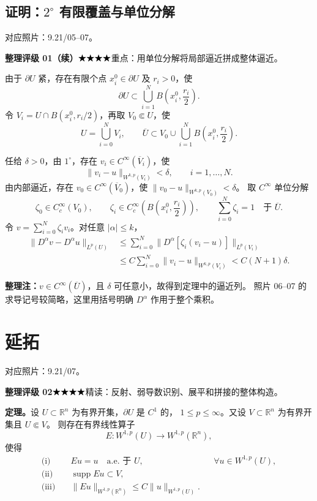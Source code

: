 \documentclass[UTF8,a4paper,11pt,fontset=fandol]{ctexart}
\newcommand{\R}{\mathbb R}
\newcommand{\ednote}[1]{\par{\small\color{notegray}\textbf{整理注：}#1}\par}
\newcommand{\source}[1]{{\small\color{notegray}对应照片：#1。}\par}
\newcommand{\proofstars}[1]{\ensuremath{%
\ifnum#1>0\relax\bigstar\fi
\ifnum#1>1\relax\bigstar\fi
\ifnum#1>2\relax\bigstar\fi
\ifnum#1>3\relax\bigstar\fi
\ifnum#1>4\relax\bigstar\fi}}
\newcommand{\proofrating}[3]{\par{\small\color{proofblue}%
\textbf{整理评级 #1}\enspace\proofstars{#2}\quad #3\par}}
\begin{document}
\subsection*{证明：$2^\circ$ 有限覆盖与单位分解}
\source{9.21/05--07}
\proofrating{01（续）}{4}{重点：用单位分解将局部逼近拼成整体逼近。}
由于 $\partial U$ 紧，存在有限个点 $x_i^0\in\partial U$ 及 $r_i>0$，使
\[
\partial U\subset\bigcup_{i=1}^N B\left(x_i^0,\frac{r_i}{2}\right).
\]
令 $V_i=U\cap B(x_i^0,r_i/2)$，再取 $V_0\Subset U$，使
\[
U=\bigcup_{i=0}^N V_i,\qquad
\overline U\subset V_0\cup\bigcup_{i=1}^N B\left(x_i^0,\frac{r_i}{2}\right).
\]
\begin{center}
\end{center}
任给 $\delta>0$，由 $1^\circ$，存在 $v_i\in C^\infty(\overline V_i)$，使
\[
\|v_i-u\|_{W^{k,p}(V_i)}<\delta,\qquad i=1,\ldots,N.
\]
由内部逼近，存在 $v_0\in C^\infty(\overline V_0)$，使
$\|v_0-u\|_{W^{k,p}(V_0)}<\delta$。
取 $C^\infty$ 单位分解
\[
\zeta_0\in C_c^\infty(V_0),\qquad
\zeta_i\in C_c^\infty\left(B\left(x_i^0,\frac{r_i}{2}\right)\right),
\qquad\sum_{i=0}^N\zeta_i=1\quad\text{于 }\overline U.
\]
令 $v=\sum_{i=0}^N\zeta_i v_i$。对任意 $|\alpha|\leq k$，
\[
\begin{aligned}
\|D^\alpha v-D^\alpha u\|_{L^p(U)}
&\leq\sum_{i=0}^N\|D^\alpha[\zeta_i(v_i-u)]\|_{L^p(V_i)}\\
&\leq C\sum_{i=0}^N\|v_i-u\|_{W^{k,p}(V_i)}
<C(N+1)\delta.
\end{aligned}
\]
\ednote{$v\in C^\infty(\overline U)$，且 $\delta$ 可任意小，故得到定理中的逼近列。
照片 06--07 的求导记号较简略，这里用括号明确 $D^\alpha$ 作用于整个乘积。}

\newpage
\section{延拓}
\source{9.21/07}
\proofrating{02}{4}{精读：反射、弱导数识别、展平和拼接的整体构造。}
\textbf{定理。}设 $U\subset\R^n$ 为有界开集，$\partial U$ 是 $C^1$ 的，
$1\leq p\leq\infty$。又设 $V\subset\R^n$ 为有界开集且 $U\Subset V$。
则存在有界线性算子
\[
E:W^{1,p}(U)\longrightarrow W^{1,p}(\R^n),
\]
使得
\[
\begin{aligned}
\text{(i)}\quad &Eu=u\quad\text{a.e. 于 }U,
&&\forall u\in W^{1,p}(U),\\
\text{(ii)}\quad &\operatorname{supp}Eu\subset V,\\
\text{(iii)}\quad &\|Eu\|_{W^{1,p}(\R^n)}\leq C\|u\|_{W^{1,p}(U)}.
\end{aligned}
\]
\end{document}
